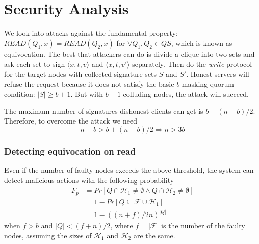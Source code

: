 \section{Security Analysis}
We look into attacks against the fundamental property:
$READ(Q_1,x) = READ(Q_2,x)$ for $\forall Q_1, Q_2 \in QS$, which is
known as equivocation.  The best that attackers can do is divide a
clique into two sets and ask each set to sign $\langle x,t,v \rangle$
and $\langle x,t,v' \rangle$ separately. Then do the {\em write}
protocol for the target nodes with collected signature sets $S$ and
$S'$. Honest servers will refuse the request because it does not
satisfy the basic $b$-masking quorum condition: $|S| \geq b+1$. But
with $b+1$ colluding nodes, the attack will succeed.

\newcommand{\slice}[4]{
  \pgfmathparse{0.5*#1+0.5*#2}
  \let\midangle\pgfmathresult

  \draw[thick,fill=black!10] (0,0) -- (#1:1) arc (#1:#2:1) -- cycle;

  \node[label=\midangle:#4] at (\midangle:1) {};

  \pgfmathparse{min((#2-#1-10)/110*(-0.3),0)}
  \let\temp\pgfmathresult
  \pgfmathparse{max(\temp,-0.5) + 0.8}
  \let\innerpos\pgfmathresult
  \node at (\midangle:\innerpos) {#3};
}



The maximum number of signatures dishonest clients can get is
$b+(n-b)/2$. Therefore, to overcome the attack we need
\[ n-b > b+(n-b)/2 \Rightarrow n > 3b \]

\subsubsection*{Detecting equivocation on read}
Even if the number of faulty nodes exceeds the above threshold, the
system can detect malicious actions with the following probability
\begin{align*}
  F_p &= Pr[Q \cap \mathcal{H}_1 \neq \emptyset \wedge Q \cap
        \mathcal{H}_2 \neq \emptyset] \\
      & = 1 - Pr[Q \subseteq \mathcal{F} \cup \mathcal{H}_1] \\
      & = 1 - ((n + f) / 2n)^{|Q|}
\end{align*}
when $f > b$ and $|Q| < (f + n)/2$, where $f = |\mathcal{F}|$ is the
number of the faulty nodes, assuming the sizes of $\mathcal{H}_1$ and
$\mathcal{H}_2$ are the same.

